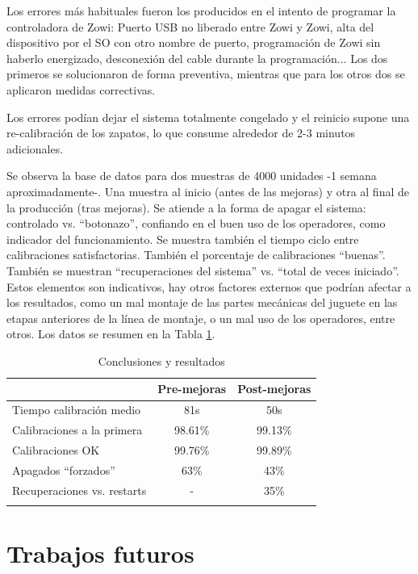 Los errores más habituales fueron los producidos en el intento de programar la controladora de Zowi: Puerto USB no liberado entre Zowi y Zowi, alta del dispositivo por el SO con otro nombre de puerto, programación de Zowi sin haberlo energizado, desconexión del cable durante la programación... Los dos primeros se solucionaron de forma preventiva, mientras que para los otros dos se aplicaron medidas correctivas.

Los errores podían dejar el sistema totalmente congelado y el reinicio supone una re-calibración de los zapatos, lo que consume alrededor de 2-3 minutos adicionales.

Se observa la base de datos para dos muestras de 4000 unidades -1 semana aproximadamente-. Una muestra al inicio (antes de las mejoras) y otra al final de la producción (tras mejoras). Se atiende a la forma de apagar el sistema: controlado vs. ``botonazo'', confiando en el buen uso de los operadores, como indicador del funcionamiento. Se muestra también el tiempo ciclo entre calibraciones satisfactorias. También el porcentaje de calibraciones ``buenas''. También se muestran ``recuperaciones del sistema'' vs. ``total de veces iniciado''. Estos elementos son indicativos, hay otros factores externos que podrían afectar a los resultados, como un mal montaje de las partes mecánicas del juguete en las etapas anteriores de la línea de montaje, o un mal uso de los operadores, entre otros. Los datos se resumen en la Tabla \ref{tableResults}.

\begin{table}[h]
\centering
\begin{tabular}{l c c}
\toprule
 & \textbf{Pre-mejoras} & \textbf{Post-mejoras} \\
\midrule
Tiempo calibración medio & 81s & 50s \\
Calibraciones a la primera & 98.61\% & 99.13\% \\
Calibraciones OK & 99.76\% & 99.89\% \\
Apagados ``forzados'' & 63\% & 43\% \\
Recuperaciones vs. restarts & - & 35\% \\
\bottomrule\\
\end{tabular}
\caption{Conclusiones y resultados}
\label{tableResults}
\end{table}

\section{Trabajos futuros}

